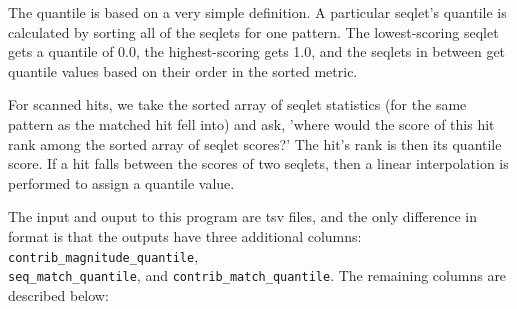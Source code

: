\documentclass{article}
\begin{document}
The quantile is based on a very simple definition.
A particular seqlet's quantile is calculated by sorting all of the seqlets for
one pattern.
The lowest-scoring seqlet gets a quantile of 0.0, the highest-scoring gets 1.0,
and the seqlets in between get quantile values based on their order in the
sorted metric.

For scanned hits, we take the sorted array of seqlet statistics (for the same
pattern as the matched hit fell into) and ask, 'where would the score of this
hit rank among the sorted array of seqlet scores?'
The hit's rank is then its quantile score.
If a hit falls between the scores of two seqlets, then a linear interpolation
is performed to assign a quantile value.

The input and ouput to this program are tsv files, and the only difference in
format is that the outputs have three additional columns:
\texttt{contrib\_magnitude\_quantile},\\ \texttt{seq\_match\_quantile}, and
\texttt{contrib\_match\_quantile}.
The remaining columns are described below:
\end{document}
